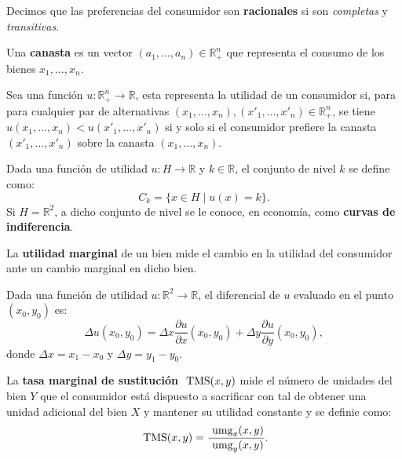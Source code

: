 \documentclass[8pt,a4paper]{extarticle}
\begin{document}
\begin{multicols}{3}
\begin{boxdef}[Racionalidad]
	Decimos que las preferencias del consumidor son \textbf{racionales} si son \emph{completas} y \emph{transitivas}.
\end{boxdef}

\begin{boxdef}[Canasta]
Una \textbf{canasta} es un vector $(a_1, \ldots, a_n) \in \mathbb{R}^n_+$ que representa el consumo de los bienes $x_1, \ldots, x_n$.
\end{boxdef}

\begin{boxdef}
	Sea una función $u : \mathbb{R}^n_+ \to \mathbb{R}$, esta representa la utilidad de un consumidor si, para para cualquier par de alternativas $(x_1, \ldots, x_n), (x'_1, \ldots, x'_n) \in \mathbb{R}^n_+$, se tiene $u(x_1, \ldots, x_n) < u(x'_1, \ldots, x'_n)$ si y solo si el consumidor prefiere la canasta $(x'_1, \ldots, x'_n)$ sobre la canasta $(x_1, \ldots, x_n)$.
\end{boxdef}

\begin{boxdef}
	Dada una función de utilidad $u : H \to \mathbb{R}$ y $k \in \mathbb{R}$, el conjunto de nivel $k$ se define como:
	\[
		C_k = \{x \in H  \mid u(x) = k\}
	.\] 
Si $H = \mathbb{R}^2$, a dicho conjunto de nivel se le conoce, en economía, como \textbf{curvas de indiferencia}.
\end{boxdef}

\begin{boxdef}
	La \textbf{utilidad marginal} de un bien mide el cambio en la utilidad del consumidor ante un cambio marginal en dicho bien.
\end{boxdef}

\begin{boxtheo}
	Dada una función de utilidad $u : \mathbb{R}^2 \to \mathbb{R}$, el diferencial de $u$ evaluado en el punto $(x_0, y_0)$ es:
	\[
		\Delta u(x_0, y_0) = \Delta x \frac{\partial u}{\partial x} (x_0, y_0) + \Delta y \frac{\partial u}{\partial y} (x_0 , y_0)
	,\] donde $\Delta x = x_1 - x_0$ y $\Delta y = y_1 - y_0$.
\end{boxtheo}

\begin{boxdef}
La \textbf{tasa marginal de sustitución} $\text{ \normalfont TMS}(x, y)$ mide el número de unidades del bien $Y$ que el consumidor está dispuesto a sacrificar con tal de obtener una unidad adicional del bien $X$ y mantener su utilidad constante y se definie como:
\[
	\text{ \normalfont TMS}(x,y)=\frac{\text{ \normalfont umg}_x (x,y)}{\text{ \normalfont umg}_y (x,y)}
.\] 
\end{boxdef}


\end{multicols}
\end{document}
